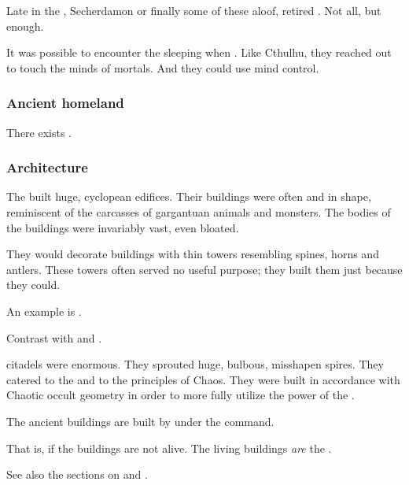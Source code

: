 Late in the \thirdbanewar, Secherdamon or \Ishnaruchaefir finally  some of these aloof, retired \dragons.
Not all, but enough.

It was possible to encounter the sleeping \dragons when .
Like Cthulhu, they reached out to touch the minds of mortals.
And they could use mind control.





\subsubsection{Ancient homeland}
There exists .





\subsubsection{Architecture}
The \dragons{} built huge, cyclopean edifices. 
Their buildings were often  and  in shape, reminiscent of the carcasses of gargantuan animals and monsters. 
The bodies of the buildings were invariably vast, even bloated. 

They would decorate buildings with thin towers resembling spines, horns and antlers. 
These towers often served no useful purpose; they built them just because they could. 

An example is . 

Contrast with  and . 

\Draconian citadels were enormous. 
They sprouted huge, bulbous, misshapen spires.
They catered to the \xss and to the principles of Chaos. 
They were built in accordance with Chaotic occult geometry in order to more fully utilize the power of the \xss. 

The ancient \draconic{} buildings are built by \daemons{} under the \psp{\dragons} command. 

That is, if the buildings are not alive. The living buildings \emph{are} the \daemons.

See also the sections on  and . 

